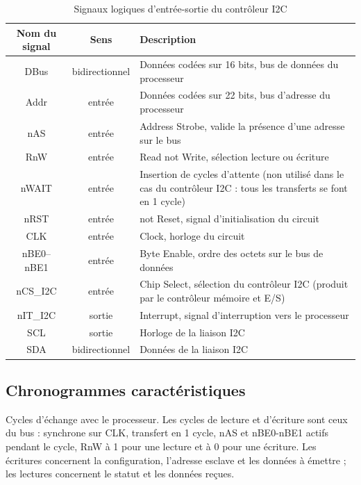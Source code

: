 \begin{table}[H]
    \centering
    \begin{tabularx}{\textwidth}{|c|c|X|}
        \hline
        \textbf{Nom du signal} & \textbf{Sens} & \textbf{Description} \\
        \hline
        DBus & bidirectionnel & Données codées sur 16 bits, bus de données du processeur \\
        \hline
        Addr & entrée & Données codées sur 22 bits, bus d'adresse du processeur \\
        \hline
        nAS & entrée & Address Strobe, valide la présence d'une adresse sur le bus \\
        \hline
        RnW & entrée & Read not Write, sélection lecture ou écriture \\
        \hline
        nWAIT & entrée & Insertion de cycles d'attente (non utilisé dans le cas du contrôleur I2C : tous les transferts se font en 1 cycle) \\
        \hline
        nRST & entrée & not Reset, signal d'initialisation du circuit \\
        \hline
        CLK & entrée & Clock, horloge du circuit \\
        \hline
        nBE0--nBE1 & entrée & Byte Enable, ordre des octets sur le bus de données \\
        \hline
        nCS\_I2C & entrée & Chip Select, sélection du contrôleur I2C (produit par le contrôleur mémoire et E/S) \\
        \hline
        nIT\_I2C & sortie & Interrupt, signal d'interruption vers le processeur \\
        \hline
        SCL & sortie & Horloge de la liaison I2C \\
        \hline
        SDA & bidirectionnel & Données de la liaison I2C \\
        \hline
    \end{tabularx}
    \caption{Signaux logiques d'entrée-sortie du contrôleur I2C}
\end{table}

\subsection{Chronogrammes caractéristiques}

Cycles d'échange avec le processeur. Les cycles de lecture et d'écriture sont ceux du
bus : synchrone sur CLK, transfert en 1 cycle,
nAS et nBE0-nBE1 actifs pendant le cycle, RnW à 1 pour une lecture et à 0 pour une
écriture. Les écritures concernent la configuration, l'adresse esclave et les données à
émettre ; les lectures concernent le statut et les données reçues.
\\

